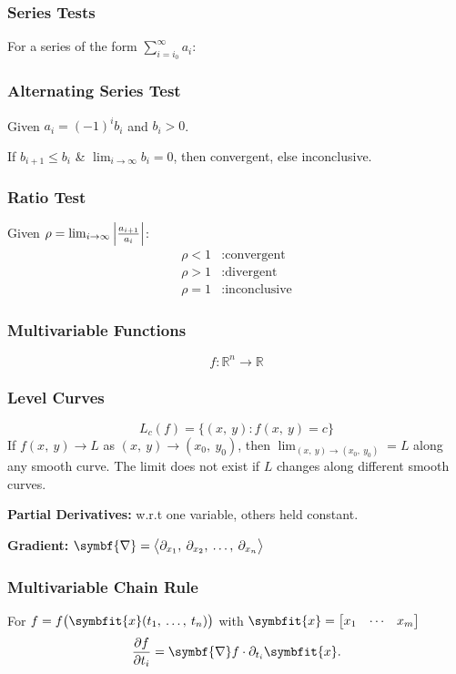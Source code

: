 \documentclass{article}
\begin{document}
\begin{multicols}{3}
    \subsubsection*{Series Tests}
    For a series of the form $\displaystyle\sum_{i=i_0}^\infty a_i$:
    \subsubsection*{Alternating Series Test}
    Given $a_i = \left( -1 \right)^i b_i$ and $b_i>0$.

    If $b_{i+1}\leqslant b_i$ \& $\lim_{i\to\infty}b_i=0$, then
    convergent, else inconclusive.
    \subsubsection*{Ratio Test}
    Given $\rho = \lim_{i\to\infty}\abs{\frac{a_{i+1}}{a_i}}$:
    \begin{align*}
        \rho < 1 & : \text{convergent}   \\
        \rho > 1 & : \text{divergent}    \\
        \rho = 1 & : \text{inconclusive}
    \end{align*}
    \subsubsection*{Multivariable Functions}
    \begin{equation*}
        f:\mathbb{R}^n\to\mathbb{R}
    \end{equation*}
    \subsubsection*{Level Curves}
    \begin{equation*}
        L_c\left( f \right) = \bigl\{ \left( x,\: y \right) : f\left(x,\: y\right) = c\bigr\}
    \end{equation*}
    If $f(x,\: y) \to L$ as $(x,\: y) \to (x_0,\: y_0)$, then
    $\displaystyle \lim_{(x,\: y) \to (x_0,\: y_0)} = L$ along any smooth
    curve. The limit does not exist if $L$ changes along different smooth curves.

    \textbf{Partial Derivatives:} w.r.t one variable, others held constant.

    \textbf{Gradient:} $\symbf{\nabla} = \avec[\big]{\partial_{x_1},\: \partial_{x_2},\: \dots,\: \partial_{x_n}}$
    \subsubsection*{Multivariable Chain Rule}
    For $f=f\bigl(\symbfit{x}(t_1,\: \ldots,\: t_n)\bigr)$ with
    $\symbfit{x}=\mqty[x_1 & \cdots & x_m]$
    \begin{equation*}
        \pdv{f}{t_i} = \symbf{\nabla}f \cdot \partial_{t_i}\symbfit{x}.
    \end{equation*}

\end{multicols}
\end{document}
